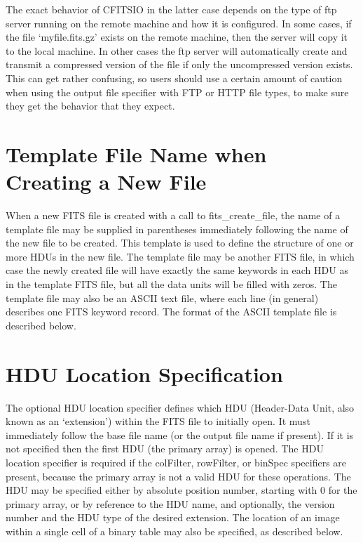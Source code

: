 \documentclass[11pt]{book}
\begin{document}
The exact behavior of CFITSIO in the latter case depends on the type of
ftp server running on the remote machine and how it is configured.  In
some cases, if the file `myfile.fits.gz' exists on the remote machine,
then the server will copy it to the local machine.  In other cases the
ftp server will automatically create and transmit a compressed version
of the file if only the uncompressed version exists.  This can get
rather confusing, so users should use a certain amount of caution when
using the output file specifier with FTP or HTTP file types, to make
sure they get the behavior that they expect.


\section{Template File Name when Creating a New File}

When a new FITS file is created with a call to fits\_create\_file, the
name of a template file may be supplied in parentheses immediately
following the name of the new file to be created.  This template is
used to define the structure of one or more HDUs in the new file.  The
template file may be another FITS file, in which case the newly created
file will have exactly the same keywords in each HDU as in the template
FITS file, but all the data units will be filled with zeros.  The
template file may also be an ASCII text file, where each line (in
general) describes one FITS keyword record.  The format of the ASCII
template file is described below.


\section{HDU Location Specification}

The optional HDU location specifier defines which HDU (Header-Data
Unit, also known as an `extension') within the FITS file to initially
open.  It must immediately follow the base file name (or the output
file name if present).  If it is not specified then the first HDU (the
primary array) is opened.  The HDU location specifier is required if
the colFilter, rowFilter, or binSpec specifiers are present, because
the primary array is not a valid HDU for these operations. The HDU may
be specified either by absolute position number, starting with 0 for
the primary array, or by reference to the HDU name, and optionally, the
version number and the HDU type of the desired extension.  The location
of an image within a single cell of a binary table may also be
specified, as described below.
\end{document}
